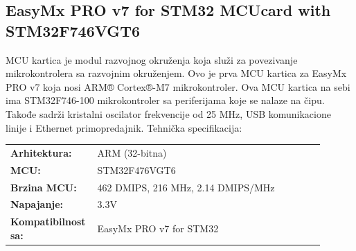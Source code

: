\documentclass[a4paper, 12pt, oneside, titlepage]{article}
\begin{document}
      \subsection{EasyMx PRO\texttrademark{} v7 for STM32\textsuperscript{\textregistered} MCUcard with STM32F746VGT6}
      MCU kartica je modul razvojnog okruženja koja služi za povezivanje mikrokontrolera sa razvojnim okruženjem.
      Ovo je prva MCU kartica za EasyMx PRO v7 koja nosi ARM® Cortex®-M7 mikrokontroler. Ova MCU kartica na sebi
      ima STM32F746-100 mikrokontroler sa periferijama koje se nalaze na čipu. Takođe sadrži kristalni oscilator
      frekvencije od 25 MHz, USB komunikacione linije i Ethernet primopredajnik.
      \bigbreak
      \noindent Tehnička specifikacija:
      \bigbreak
      \begin{tabular}{>{\bfseries}p{0.2\linewidth}p{0.7\linewidth}}
	Arhitektura: & ARM (32-bitna) \\
	MCU: & STM32F476VGT6 \\
	Brzina MCU: & 462 DMIPS, 216 MHz, 2.14 DMIPS/MHz \\
	Napajanje: & 3.3V \\
	Kompatibilnost sa: & EasyMx PRO v7 for STM32 \\
      \end{tabular}
\end{document}
